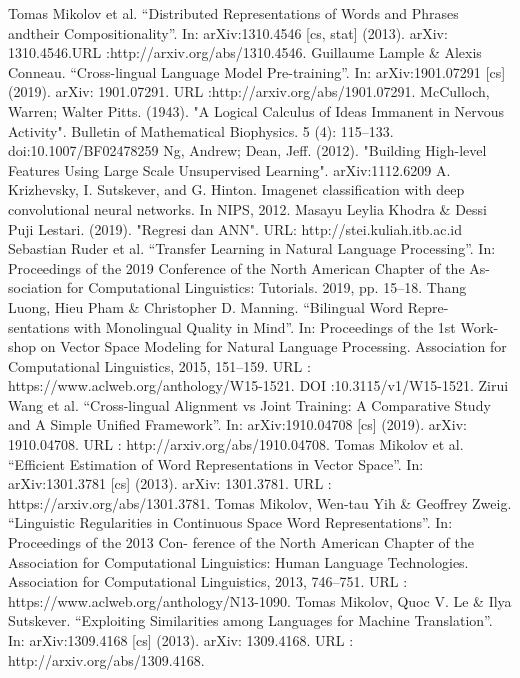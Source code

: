\documentclass[conference]{IEEEtran}
\begin{document}
\begin{thebibliography}{00}
 Tomas Mikolov et al. “Distributed Representations of Words and Phrases andtheir Compositionality”. In: arXiv:1310.4546 [cs, stat] (2013). arXiv: 1310.4546.URL :http://arxiv.org/abs/1310.4546.
 Guillaume Lample \& Alexis Conneau. “Cross-lingual Language Model Pre-training”. In: arXiv:1901.07291 [cs] (2019). arXiv: 1901.07291.
URL :http://arxiv.org/abs/1901.07291.
 McCulloch, Warren; Walter Pitts. (1943). "A Logical Calculus of Ideas Immanent in Nervous Activity". Bulletin of Mathematical Biophysics. 5 (4): 115–133. doi:10.1007/BF02478259
 Ng, Andrew; Dean, Jeff. (2012). "Building High-level Features Using Large Scale Unsupervised Learning". arXiv:1112.6209
 A. Krizhevsky, I. Sutskever, and G. Hinton. Imagenet classification with deep convolutional neural networks. In NIPS, 2012.
 Masayu Leylia Khodra \& Dessi Puji Lestari. (2019). "Regresi dan ANN". URL: http://stei.kuliah.itb.ac.id
 Sebastian Ruder et al. “Transfer Learning in Natural Language Processing”. In: Proceedings of the 2019 Conference of the North American Chapter of the As- sociation for Computational Linguistics: Tutorials. 2019, pp. 15–18.
 Thang Luong, Hieu Pham \& Christopher D. Manning. “Bilingual Word Repre- sentations with Monolingual Quality in Mind”. In: Proceedings of the 1st Work- shop on Vector Space Modeling for Natural Language Processing. Association for Computational Linguistics, 2015, 151–159. URL : https://www.aclweb.org/anthology/W15-1521. DOI :10.3115/v1/W15-1521.
 Zirui Wang et al. “Cross-lingual Alignment vs Joint Training: A Comparative Study and A Simple Unified Framework”. In: arXiv:1910.04708 [cs] (2019). arXiv: 1910.04708. URL : http://arxiv.org/abs/1910.04708.
 Tomas Mikolov et al. “Efficient Estimation of Word Representations in Vector Space”. In: arXiv:1301.3781 [cs] (2013). arXiv: 1301.3781. URL : https://arxiv.org/abs/1301.3781.
 Tomas Mikolov, Wen-tau Yih \& Geoffrey Zweig. “Linguistic Regularities in Continuous Space Word Representations”. In: Proceedings of the 2013 Con- ference of the North American Chapter of the Association for Computational Linguistics: Human Language Technologies. Association for Computational Linguistics, 2013, 746–751. URL : https://www.aclweb.org/anthology/N13-1090.
 Tomas Mikolov, Quoc V. Le \& Ilya Sutskever. “Exploiting Similarities among Languages for Machine Translation”. In: arXiv:1309.4168 [cs] (2013). arXiv: 1309.4168. URL : http://arxiv.org/abs/1309.4168.

\end{thebibliography}
\end{document}
